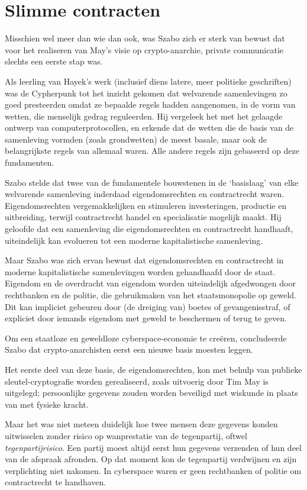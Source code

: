 \documentclass[
  a5paper,
  smalldemyvopaper,11pt,twoside,onecolumn,openright,extrafontsizes]{memoir}
\begin{document}
\section{Slimme contracten}\label{slimme-contracten}

Misschien wel meer dan wie dan ook, was Szabo zich er sterk van bewust
dat voor het realiseren van May's visie op crypto-anarchie, private
communicatie slechts een eerste stap was.

Als leerling van Hayek's werk (inclusief diens latere, meer politieke
geschriften) was de Cypherpunk tot het inzicht gekomen dat welvarende
samenlevingen zo goed presteerden omdat ze bepaalde regels hadden
aangenomen, in de vorm van wetten, die menselijk gedrag reguleerden. Hij
vergeleek het met het gelaagde ontwerp van computerprotocollen, en
erkende dat de wetten die de basis van de samenleving vormden (zoals
grondwetten) de meest basale, maar ook de belangrijkste regels van
allemaal waren. Alle andere regels zijn gebaseerd op deze fundamenten.

Szabo stelde dat twee van de fundamentele bouwstenen in de `basislaag'
van elke welvarende samenleving inderdaad eigendomsrechten en
contractrecht waren. Eigendomsrechten vergemakkelijken en stimuleren
investeringen, productie en uitbreiding, terwijl contractrecht handel en
specialisatie mogelijk maakt. Hij geloofde dat een samenleving die
eigendomsrechten en contractrecht handhaaft, uiteindelijk kan evolueren
tot een moderne kapitalistische samenleving.

Maar Szabo was zich ervan bewust dat eigendomsrechten en contractrecht
in moderne kapitalistische samenlevingen worden gehandhaafd door de
staat. Eigendom en de overdracht van eigendom worden uiteindelijk
afgedwongen door rechtbanken en de politie, die gebruikmaken van het
staatsmonopolie op geweld. Dit kan impliciet gebeuren door (de dreiging
van) boetes of gevangenisstraf, of expliciet door iemands eigendom met
geweld te beschermen of terug te geven.

Om een staatloze en geweldloze cyberspace-economie te creëren,
concludeerde Szabo dat crypto-anarchisten eerst een nieuwe basis moesten
leggen.

Het eerste deel van deze basis, de eigendomsrechten, kon met behulp van
publieke sleutel-cryptografie worden gerealiseerd, zoals uitvoerig door
Tim May is uitgelegd; persoonlijke gegevens zouden worden beveiligd met
wiskunde in plaats van met fysieke kracht.

Maar het was niet meteen duidelijk hoe twee mensen deze gegevens konden
uitwisselen zonder risico op wanprestatie van de tegenpartij, oftwel
\emph{tegenpartijrisico}. Een partij moest altijd eerst hun gegevens
verzenden of hun deel van de afspraak afronden. Op dat moment kon de
tegenpartij verdwijnen en zijn verplichting niet nakomen. In cyberspace
waren er geen rechtbanken of politie om contractrecht te handhaven.
\end{document}
